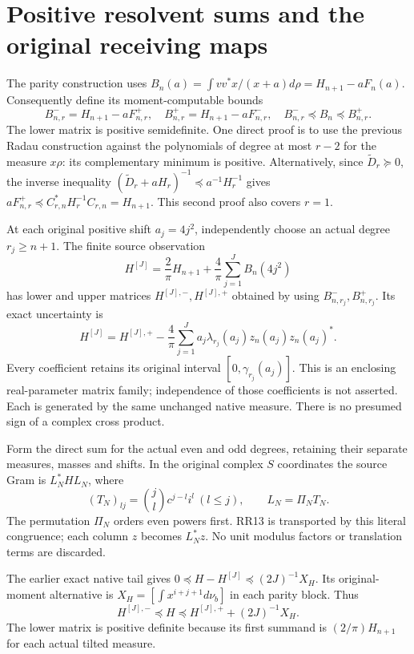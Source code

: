 \section{Positive resolvent sums and the original receiving maps}
The parity construction uses
$B_n(a)=\int vv^*x/(x+a)d\rho=H_{n+1}-aF_n(a)$.
Consequently define its moment-computable bounds
\begin{equation}\tag{RR12}\label{rrnative:eq:B}
 B^-_{n,r}=H_{n+1}-aF^+_{n,r},\quad
 B^+_{n,r}=H_{n+1}-aF^-_{n,r},\quad
 B^-_{n,r}\preceq B_n\preceq B^+_{n,r}.
\end{equation}
The lower matrix is positive semidefinite. One direct proof is to
use the previous Radau construction against the polynomials of
degree at most $r-2$ for the measure $x\rho$: its complementary
minimum is positive. Alternatively, since
$\widetilde D_r\succeq0$, the inverse inequality
$(\widetilde D_r+aH_r)^{-1}\preceq a^{-1}H_r^{-1}$ gives
$aF^+_{n,r}\preceq C_{r,n}^*H_r^{-1}C_{r,n}=H_{n+1}$.
This second proof also covers $r=1$.

At each original positive shift $a_j=4j^2$, independently choose
an actual degree $r_j\ge n+1$. The finite source observation
\[
 H^{[J]}=\frac2\pi H_{n+1}
          +\frac4\pi\sum_{j=1}^JB_n(4j^2)
\]
has lower and upper matrices $H^{[J],-},H^{[J],+}$ obtained by
using $B^-_{n,r_j},B^+_{n,r_j}$. Its exact uncertainty is
\begin{equation}\tag{RR13}\label{rrnative:eq:zonotope}
 H^{[J]}=H^{[J],+}
    -\frac4\pi\sum_{j=1}^J a_j\lambda_{r_j}(a_j)z_n(a_j)z_n(a_j)^*.
\end{equation}
Every coefficient retains its original interval $[0,\gamma_{r_j}(a_j)]$.
This is an enclosing real-parameter matrix family; independence of
those coefficients is not asserted. Each is generated by the same
unchanged native measure. There is no presumed sign of a complex
cross product.

Form the direct sum for the actual even and odd degrees, retaining
their separate measures, masses and shifts. In the original complex
$S$ coordinates the source Gram is $L_N^*HL_N$, where
\[
 (T_N)_{lj}=\binom jl c^{j-l}i^l\ (l\le j),\qquad
 L_N=\Pi_NT_N.
\]
The permutation $\Pi_N$ orders even powers first. RR13 is transported
by this literal congruence; each column $z$ becomes $L_N^*z$.
No unit modulus factors or translation terms are discarded.

The earlier exact native tail \cite{rrnative:TR} gives
$0\preceq H-H^{[J]}\preceq(2J)^{-1}X_H$.
Its original-moment alternative is
$X_H=[\int x^{i+j+1}d\nu_b]$ in each parity block. Thus
\begin{equation}\tag{RR14}\label{rrnative:eq:source}
 H^{[J],-}\preceq H\preceq H^{[J],+}+(2J)^{-1}X_H.
\end{equation}
The lower matrix is positive definite because its first summand
is $(2/\pi)H_{n+1}$ for each actual tilted measure.

